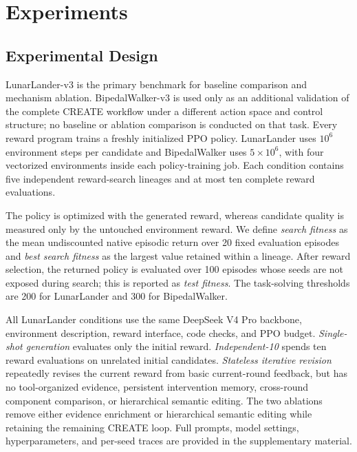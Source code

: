 \section{Experiments}
\label{sec:experiments}

\subsection{Experimental Design}
LunarLander-v3 is the primary benchmark for baseline comparison and mechanism ablation. BipedalWalker-v3 is used only as an additional validation of the complete CREATE workflow under a different action space and control structure; no baseline or ablation comparison is conducted on that task. Every reward program trains a freshly initialized PPO policy. LunarLander uses $10^6$ environment steps per candidate and BipedalWalker uses $5\times10^6$, with four vectorized environments inside each policy-training job. Each condition contains five independent reward-search lineages and at most ten complete reward evaluations.

The policy is optimized with the generated reward, whereas candidate quality is measured only by the untouched environment reward. We define \emph{search fitness} as the mean undiscounted native episodic return over 20 fixed evaluation episodes and \emph{best search fitness} as the largest value retained within a lineage. After reward selection, the returned policy is evaluated over 100 episodes whose seeds are not exposed during search; this is reported as \emph{test fitness}. The task-solving thresholds are 200 for LunarLander and 300 for BipedalWalker.

All LunarLander conditions use the same DeepSeek V4 Pro backbone, environment description, reward interface, code checks, and PPO budget. \emph{Single-shot generation} evaluates only the initial reward. \emph{Independent-10} spends ten reward evaluations on unrelated initial candidates. \emph{Stateless iterative revision} repeatedly revises the current reward from basic current-round feedback, but has no tool-organized evidence, persistent intervention memory, cross-round component comparison, or hierarchical semantic editing. The two ablations remove either evidence enrichment or hierarchical semantic editing while retaining the remaining CREATE loop. Full prompts, model settings, hyperparameters, and per-seed traces are provided in the supplementary material.

